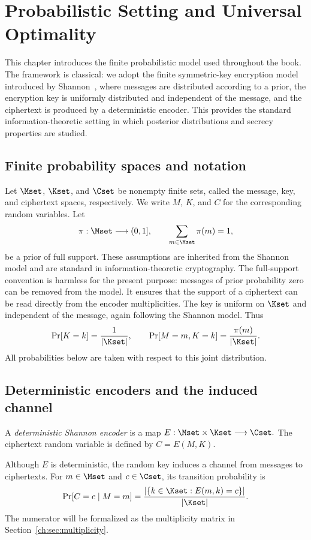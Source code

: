 \chapter[Probabilistic Setting]{Probabilistic Setting and Universal Optimality}\label{ch:sec:background}
This chapter introduces the finite probabilistic model used throughout the book.  The framework is classical: we adopt the finite symmetric-key encryption model introduced by Shannon~\cite{shannon1949}, where messages are distributed according to a prior, the encryption key is uniformly distributed and independent of the message, and the ciphertext is produced by a deterministic encoder.  This provides the standard information-theoretic setting in which posterior distributions and secrecy properties are studied.
\section{Finite probability spaces and notation}
Let $\Mset$, $\Kset$, and $\Cset$ be nonempty finite sets, called the message, key, and ciphertext spaces, respectively. We write $M$, $K$, and $C$ for the corresponding random variables. Let
\[
  \pi:\Mset\longrightarrow (0,1],\qquad \sum_{m\in\Mset}\pi(m)=1,
\]
be a prior of full support. These assumptions are inherited from the Shannon model and are standard in information-theoretic cryptography.
The full-support convention is harmless for the present purpose: messages of prior probability zero can be removed from the model. It ensures that the support of a ciphertext can be read directly from the encoder multiplicities.
The key is uniform on $\Kset$ and independent of the message, again following the Shannon model. Thus
\[
  \Pr[K=k]=\frac{1}{|\Kset|},\qquad
  \Pr[M=m,K=k]=\frac{\pi(m)}{|\Kset|}.
\]
All probabilities below are taken with respect to this joint distribution.
\section{Deterministic encoders and the induced channel}
\begin{definition}\label{ch:def:encoder}
A \emph{deterministic Shannon encoder} is a map $E:\Mset\times\Kset\longrightarrow\Cset.$ The ciphertext random variable is defined by $C=E(M,K)$.
\end{definition}
Although $E$ is deterministic, the random key induces a channel from messages to ciphertexts. For $m\in\Mset$ and $c\in\Cset$, its transition probability is
\[
  \Pr[C=c\mid M=m]
  =\frac{|\{k\in\Kset:E(m,k)=c\}|}{|\Kset|}.
\]
The numerator will be formalized as the multiplicity matrix in Section~\ref{ch:sec:multiplicity}.
